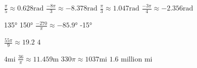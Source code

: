  \begin{Answer}[ref={exUnitCircle}]
\Question %
\begin{tasks}
	\task 	 $\frac{\pi }{5} \approx 0.628 \mbox{rad}$ 
	\task 	 $\frac{ -8 \pi }{3} \approx  -8.378 \mbox{rad}$
	\task 	 $\frac{\pi }{3} \approx 1.047 \mbox{rad}$ 
	\task 	 $\frac{ -3 \pi }{4} \approx  -2.356 \mbox{rad}$
\end{tasks}
\Question %
\begin{tasks}
	\task 	\ang{135}
	\task 	\ang{150}
	\task 	$\frac{ -270}{\pi } \approx  \ang{-85.9}$
	\task 	\ang{-15}
\end{tasks}
\Question %
\begin{tasks}
	\task 	 $\frac{55 \pi }{9} \approx 19.2$
	\task 	$4$
\end{tasks}
\Question $4 \mbox{mi}$
\Question $\frac{36}{\pi } \approx 11.459 \mbox{m}$
\Question $330 \pi  \approx 1037 \mbox{mi}$
\Question $1.6$ million $\mbox{mi}$
\end{Answer}
